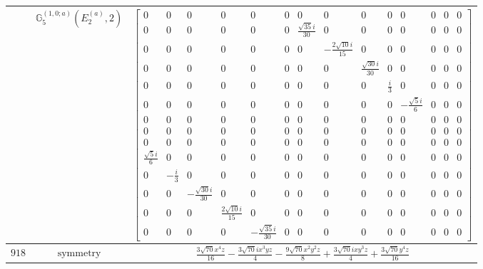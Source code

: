 \documentclass[fleqn,8pt,landscape]{jsarticle}
\begin{document}
\begin{longtable}{ccc}
$  $ & $ \mathbb{G}_{5}^{(1,0;a)}(E_{2}^{(a)},2) $ & $ \begin{bmatrix} 0 & 0 & 0 & 0 & 0 & 0 & 0 & 0 & 0 & 0 & 0 & 0 & 0 & 0 \\ 0 & 0 & 0 & 0 & 0 & 0 & \frac{\sqrt{35} i}{30} & 0 & 0 & 0 & 0 & 0 & 0 & 0 \\ 0 & 0 & 0 & 0 & 0 & 0 & 0 & - \frac{2 \sqrt{10} i}{15} & 0 & 0 & 0 & 0 & 0 & 0 \\ 0 & 0 & 0 & 0 & 0 & 0 & 0 & 0 & \frac{\sqrt{30} i}{30} & 0 & 0 & 0 & 0 & 0 \\ 0 & 0 & 0 & 0 & 0 & 0 & 0 & 0 & 0 & \frac{i}{3} & 0 & 0 & 0 & 0 \\ 0 & 0 & 0 & 0 & 0 & 0 & 0 & 0 & 0 & 0 & - \frac{\sqrt{5} i}{6} & 0 & 0 & 0 \\ 0 & 0 & 0 & 0 & 0 & 0 & 0 & 0 & 0 & 0 & 0 & 0 & 0 & 0 \\ 0 & 0 & 0 & 0 & 0 & 0 & 0 & 0 & 0 & 0 & 0 & 0 & 0 & 0 \\ 0 & 0 & 0 & 0 & 0 & 0 & 0 & 0 & 0 & 0 & 0 & 0 & 0 & 0 \\ \frac{\sqrt{5} i}{6} & 0 & 0 & 0 & 0 & 0 & 0 & 0 & 0 & 0 & 0 & 0 & 0 & 0 \\ 0 & - \frac{i}{3} & 0 & 0 & 0 & 0 & 0 & 0 & 0 & 0 & 0 & 0 & 0 & 0 \\ 0 & 0 & - \frac{\sqrt{30} i}{30} & 0 & 0 & 0 & 0 & 0 & 0 & 0 & 0 & 0 & 0 & 0 \\ 0 & 0 & 0 & \frac{2 \sqrt{10} i}{15} & 0 & 0 & 0 & 0 & 0 & 0 & 0 & 0 & 0 & 0 \\ 0 & 0 & 0 & 0 & - \frac{\sqrt{35} i}{30} & 0 & 0 & 0 & 0 & 0 & 0 & 0 & 0 & 0 \end{bmatrix} $ \\ \hline
$ 918 $ & $ \text{symmetry} $ & $ \frac{3 \sqrt{70} x^{4} z}{16} - \frac{3 \sqrt{70} i x^{3} y z}{4} - \frac{9 \sqrt{70} x^{2} y^{2} z}{8} + \frac{3 \sqrt{70} i x y^{3} z}{4} + \frac{3 \sqrt{70} y^{4} z}{16} $ \\

\end{longtable}
\end{document}
